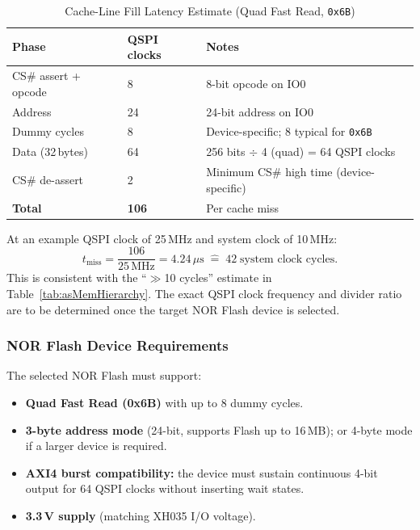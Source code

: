 \begin{table}[H]
\caption{Cache-Line Fill Latency Estimate (Quad Fast Read, \texttt{0x6B})}
\label{tab:asQspiLat}
\centering
\begin{tabularx}{\textwidth}{|l |l |X|}
  \hline
  Phase & QSPI clocks & Notes \\
  \hline
  \hline
  CS\# assert + opcode  &  8 & 8-bit opcode on IO0 \\
  \hline
  Address               & 24 & 24-bit address on IO0 \\
  \hline
  Dummy cycles          &  8 & Device-specific; 8 typical for \texttt{0x6B} \\
  \hline
  Data (32\,bytes)      & 64 & 256 bits $\div$ 4 (quad) = 64 QSPI clocks \\
  \hline
  CS\# de-assert        &  2 & Minimum CS\# high time (device-specific) \\
  \hline
  \textbf{Total}        & \textbf{106} & Per cache miss \\
  \hline
\end{tabularx}
\end{table}

At an example QSPI clock of 25\,MHz and system clock of 10\,MHz:
\[
  t_\text{miss} = \frac{106}{25\,\text{MHz}} = 4.24\,\mu\text{s}
  \;\widehat{=}\; 42\;\text{system clock cycles}.
\]
This is consistent with the ``$\gg$10 cycles'' estimate in
Table~\ref{tab:asMemHierarchy}.
The exact QSPI clock frequency and divider ratio are to be determined
once the target NOR Flash device is selected.

\subsubsection{NOR Flash Device Requirements}

The selected NOR Flash must support:

\begin{itemize}
  \item \textbf{Quad Fast Read (0x6B)} with up to 8 dummy cycles.
  \item \textbf{3-byte address mode} (24-bit, supports Flash up to 16\,MB);
    or 4-byte mode if a larger device is required.
  \item \textbf{AXI4 burst compatibility:} the device must sustain
    continuous 4-bit output for 64 QSPI clocks without inserting wait
    states.
  \item \textbf{3.3\,V supply} (matching XH035 I/O voltage).
\end{itemize}

